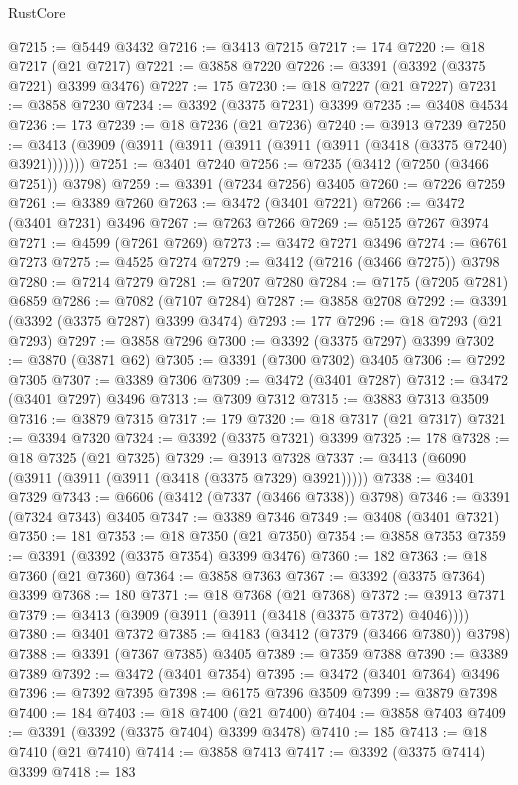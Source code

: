 \begin{lexlean}{RustCore}
\begin{coremodule}
@7215 := @5449 @3432
@7216 := @3413 @7215
@7217 := 174
@7220 := @18 @7217 (@21 @7217)
@7221 := @3858 @7220
@7226 := @3391 (@3392 (@3375 @7221) @3399 @3476)
@7227 := 175
@7230 := @18 @7227 (@21 @7227)
@7231 := @3858 @7230
@7234 := @3392 (@3375 @7231) @3399
@7235 := @3408 @4534
@7236 := 173
@7239 := @18 @7236 (@21 @7236)
@7240 := @3913 @7239
@7250 := @3413 (@3909 (@3911 (@3911 (@3911 (@3911 (@3911 (@3418 (@3375 @7240) @3921)))))))
@7251 := @3401 @7240
@7256 := @7235 (@3412 (@7250 (@3466 @7251)) @3798)
@7259 := @3391 (@7234 @7256) @3405
@7260 := @7226 @7259
@7261 := @3389 @7260
@7263 := @3472 (@3401 @7221)
@7266 := @3472 (@3401 @7231) @3496
@7267 := @7263 @7266
@7269 := @5125 @7267 @3974
@7271 := @4599 (@7261 @7269)
@7273 := @3472 @7271 @3496
@7274 := @6761 @7273
@7275 := @4525 @7274
@7279 := @3412 (@7216 (@3466 @7275)) @3798
@7280 := @7214 @7279
@7281 := @7207 @7280
@7284 := @7175 (@7205 @7281) @6859
@7286 := @7082 (@7107 @7284)
@7287 := @3858 @2708
@7292 := @3391 (@3392 (@3375 @7287) @3399 @3474)
@7293 := 177
@7296 := @18 @7293 (@21 @7293)
@7297 := @3858 @7296
@7300 := @3392 (@3375 @7297) @3399
@7302 := @3870 (@3871 @62)
@7305 := @3391 (@7300 @7302) @3405
@7306 := @7292 @7305
@7307 := @3389 @7306
@7309 := @3472 (@3401 @7287)
@7312 := @3472 (@3401 @7297) @3496
@7313 := @7309 @7312
@7315 := @3883 @7313 @3509
@7316 := @3879 @7315
@7317 := 179
@7320 := @18 @7317 (@21 @7317)
@7321 := @3394 @7320
@7324 := @3392 (@3375 @7321) @3399
@7325 := 178
@7328 := @18 @7325 (@21 @7325)
@7329 := @3913 @7328
@7337 := @3413 (@6090 (@3911 (@3911 (@3911 (@3418 (@3375 @7329) @3921)))))
@7338 := @3401 @7329
@7343 := @6606 (@3412 (@7337 (@3466 @7338)) @3798)
@7346 := @3391 (@7324 @7343) @3405
@7347 := @3389 @7346
@7349 := @3408 (@3401 @7321)
@7350 := 181
@7353 := @18 @7350 (@21 @7350)
@7354 := @3858 @7353
@7359 := @3391 (@3392 (@3375 @7354) @3399 @3476)
@7360 := 182
@7363 := @18 @7360 (@21 @7360)
@7364 := @3858 @7363
@7367 := @3392 (@3375 @7364) @3399
@7368 := 180
@7371 := @18 @7368 (@21 @7368)
@7372 := @3913 @7371
@7379 := @3413 (@3909 (@3911 (@3911 (@3418 (@3375 @7372) @4046))))
@7380 := @3401 @7372
@7385 := @4183 (@3412 (@7379 (@3466 @7380)) @3798)
@7388 := @3391 (@7367 @7385) @3405
@7389 := @7359 @7388
@7390 := @3389 @7389
@7392 := @3472 (@3401 @7354)
@7395 := @3472 (@3401 @7364) @3496
@7396 := @7392 @7395
@7398 := @6175 @7396 @3509
@7399 := @3879 @7398
@7400 := 184
@7403 := @18 @7400 (@21 @7400)
@7404 := @3858 @7403
@7409 := @3391 (@3392 (@3375 @7404) @3399 @3478)
@7410 := 185
@7413 := @18 @7410 (@21 @7410)
@7414 := @3858 @7413
@7417 := @3392 (@3375 @7414) @3399
@7418 := 183

\end{coremodule}
\end{lexlean}
